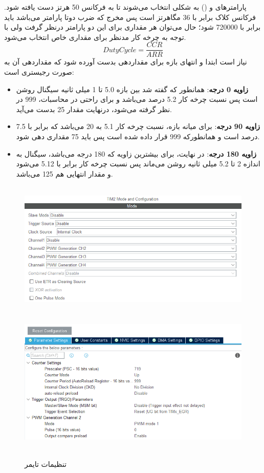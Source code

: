 پارامترهای \unskip{} و \unskip{}() به شکلی انتخاب می‌شوند تا به فرکانس 50 هرتز دست یافته شود. فرکانس کلاک برابر با 36 مگاهرتز است پس مخرج که ضرب دوتا پارامتر می‌باشد باید برابر با 720000 شود؛ حال می‌توان هر مقداری برای این دو پارامتر درنظر گرفت ولی با توجه به چرخه کار مدنظر برای  مقداری خاص انتخاب می‌شود. 
\begin{equation}
	DutyCycle =\frac{CCR}{ARR}
\end{equation}
نیاز است ابتدا و انتهای بازه برای مقداردهی  بدست آورده شود که مقداردهی آن به صورت رجیستری است:
\begin{itemize}
	\item \textbf{زاویه 0 درجه}: همانطور که گفته شد بین بازه 5.0 تا 1 میلی ثانیه سیگنال روشن است پس نسبت چرخه کار 5.2 درصد می‌باشد و برای راحتی در محاسبات،  999 در نظر گرفته می‌شود، درنهایت مقدار  25 بدست می‌آید.
	\item \textbf{زاویه 90 درجه}: برای میانه بازه، نسبت چرخه کار 5.1 به 20 می‌باشد که برابر با 7.5 درصد است و همانطورکه  999 قرار داده شده است پس  باید 75 مقداری دهی شود.
	\item \textbf{زاویه 180 درجه}: در نهایت، برای بیشترین زاویه که 180 درجه می‌باشد، سیگنال به اندازه 2 تا 5.2 میلی ثانیه روشن می‌ماند پس نسبت چرخه کار برابر با 5.12 می‌شود و مقدار انتهایی  هم 125 می‌باشد. 
\end{itemize}

    \begin{figure}[!h]
	\centering
	\includegraphics[height=6.5cm,width=12cm]{./Images/CH4/CubeMX_PWM_Config_1.PNG}
	\includegraphics[height=7cm,width=12cm]{./Images/CH4/CubeMX_PWM_Config_2.PNG}
	\caption[تنظیمات تایمر]{تنظیمات تایمر}
	\label{تنظیمات تایمر}
	\end{figure}

